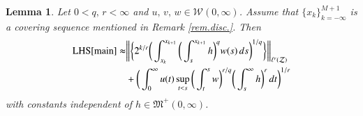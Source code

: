 \documentclass[12pt]{amsart}
\theoremstyle{plain}
\newtheorem{lem}[thm]{Lemma}
\theoremstyle{definition}
\numberwithin{thm}{section}
\numberwithin{equation}{section}
\begin{document}
\begin{lem}\label{lem.1.4}
	Let $0 < q,\, r < \infty$ and  $u,\,v,\,w \in {\mathcal W}{(0,\infty)}$.	Assume that $\{x_k\}_{k=-\infty}^{M + 1}$ is a covering sequence mentioned in Remark \ref{rem.disc.}.
	Then
	\begin{align}
	{\operatorname{LHS}}{\eqref{main}} \thickapprox &  \bigg\| \bigg\{ 2^{k / r} \bigg(
	\int_{x_k}^{x_{k+1}} \bigg( \int_s^{x_{k+1}} h \bigg)^q
	w(s)\,ds\bigg)^{ 1 / q} \bigg\} \bigg\|_{\ell^r({\mathcal Z})} \notag \\
	&  +  \bigg( \int_0^{\infty}  u(t) \sup_{t < s} \bigg(
	\int_t^s w \bigg)^{r / q} \bigg( \int_s^{\infty} h\bigg)^r \,dt\bigg)^{1/r} 
	\end{align}
	with constants independent of $h \in {\mathfrak M}^+(0,\infty)$.
\end{lem}
\end{document}
